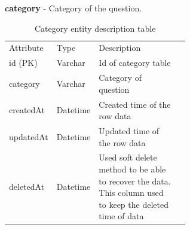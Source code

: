 \documentclass[12pt,oneside,openright,a4paper]{cpe-english-project}
\begin{document}
\textbf{category} - Category of the question.
\begin{table}[ht]
	\caption{Category entity description table}
	\label{tab:Category entity description table}
\begin{adjustbox}{width=\textwidth}
\begin{tabular}{llp{0.6\linewidth}l}
\rowcolor[HTML]{5B9BD5} 
Attribute & Type     & Description                                                                                                 \\
\rowcolor[HTML]{DEEAF6} 
id (PK)   & Varchar  & Id of category table                                                                                        \\
category  & Varchar  & Category of question                                                                                        \\
\rowcolor[HTML]{DEEAF6} 
createdAt & Datetime & Created time of the row data                                                                                \\
updatedAt & Datetime & Updated time of the row   data                                                                              \\
\rowcolor[HTML]{DEEAF6} 
deletedAt & Datetime & Used soft delete method to be able to recover the data. This column   used to keep the deleted time of data
\end{tabular}
\end{adjustbox}
\end{table}

\pagebreak
\end{document}
